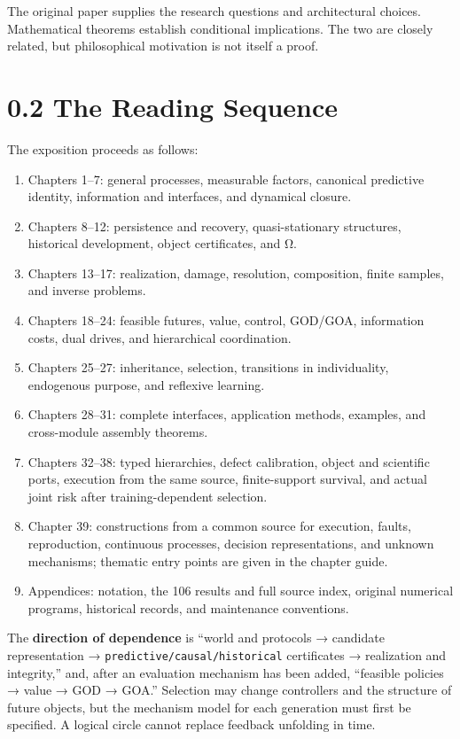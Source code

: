 \documentclass[
  english,
  11pt,
  oneside]{book}
\providecommand{\tightlist}{%
  \setlength{\itemsep}{0pt}\setlength{\parskip}{0pt}}
\begin{document}
The original paper supplies the research questions and architectural choices. Mathematical theorems establish conditional implications. The two are closely related, but philosophical motivation is not itself a proof.

\section{0.2 The Reading Sequence}\label{the-reading-sequence}

The exposition proceeds as follows:

\begin{enumerate}
\def\labelenumi{\arabic{enumi}.}
\tightlist
\item
  Chapters 1--7: general processes, measurable factors, canonical predictive identity, information and interfaces, and dynamical closure.
\item
  Chapters 8--12: persistence and recovery, quasi-stationary structures, historical development, object certificates, and Ω.
\item
  Chapters 13--17: realization, damage, resolution, composition, finite samples, and inverse problems.
\item
  Chapters 18--24: feasible futures, value, control, GOD/GOA, information costs, dual drives, and hierarchical coordination.
\item
  Chapters 25--27: inheritance, selection, transitions in individuality, endogenous purpose, and reflexive learning.
\item
  Chapters 28--31: complete interfaces, application methods, examples, and cross-module assembly theorems.
\item
  Chapters 32--38: typed hierarchies, defect calibration, object and scientific ports, execution from the same source, finite-support survival, and actual joint risk after training-dependent selection.
\item
  Chapter 39: constructions from a common source for execution, faults, reproduction, continuous processes, decision representations, and unknown mechanisms; thematic entry points are given in the chapter guide.
\item
  Appendices: notation, the 106 results and full source index, original numerical programs, historical records, and maintenance conventions.
\end{enumerate}

The \textbf{direction of dependence} is ``world and protocols → candidate representation → \nolinkurl{predictive/causal/historical} certificates → realization and integrity,'' and, after an evaluation mechanism has been added, ``feasible policies → value → GOD → GOA.'' Selection may change controllers and the structure of future objects, but the mechanism model for each generation must first be specified. A logical circle cannot replace feedback unfolding in time.
\end{document}
